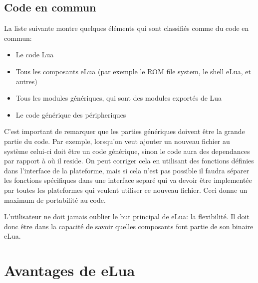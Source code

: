 \subsection{Code en commun}

La liste suivante montre quelques éléments qui sont classifiés comme du code en commun:

\begin{itemize}
 \item Le code Lua
 \item Tous les composants eLua (par exemple le ROM file system, le shell eLua, et autres)
 \item Tous les modules génériques, qui sont des modules exportés de Lua
 \item Le code générique des péripheriques
\end{itemize}

C'est important de remarquer que les parties génériques doivent être la grande partie du code. Par exemple, lorsqu'on veut ajouter un nouveau fichier au système
celui-ci doit être un code générique, sinon le code aura des dependances par rapport à où il reside. On peut corriger cela en utilisant des fonctions
définies dans l'interface de la plateforme, mais si cela n'est pas possible il faudra séparer les fonctions spécifiques dans une interface separé qui va
devoir être implementée par toutes les plateformes qui veulent utiliser ce nouveau fichier. Ceci donne un maximum de portabilité au code.

L'utilisateur ne doit jamais oublier le but principal de eLua: la flexibilité. Il doit donc être dans la capacité de savoir quelles composants font partie
de son binaire eLua.

\section{Avantages de eLua}


